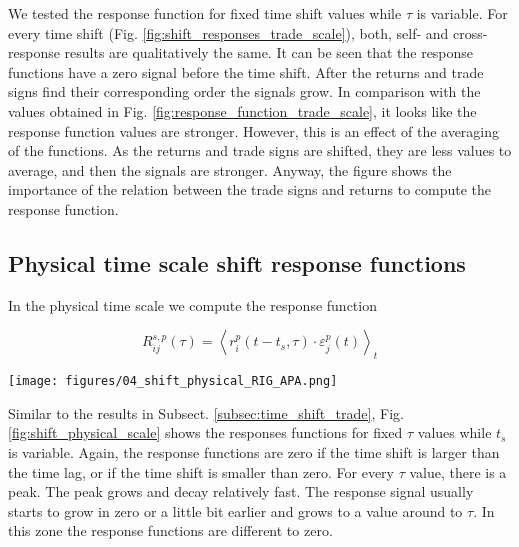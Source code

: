 We tested the response function for fixed time shift values while $\tau$ is
variable. For every time shift (Fig. \ref{fig:shift_responses_trade_scale}),
both, self- and cross-response results are qualitatively the same. It can be
seen that the response functions have a zero signal before the time shift.
After the returns and trade signs find their corresponding order the signals
grow. In comparison with the values obtained in Fig.
\ref{fig:response_function_trade_scale}, it looks like the response function
values are stronger. However, this is an effect of the averaging of the
functions. As the returns and trade signs are shifted, they are less values to
average, and then the signals are stronger. Anyway, the figure shows the
importance of the relation between the trade signs and returns to compute the
response function.

\subsection{Physical time scale shift response functions}
\label{subsec:time_shift_physical}

In the physical time scale we compute the response function

\begin{equation}\label{eq:time_shift_physical}
    R_{ij}^{s, p}\left(\tau\right)=\left\langle r^{p}_{i}
    \left(t-t_{s},\tau\right) \cdot\varepsilon^{p}_{j}
    \left(t\right)\right\rangle _{t}
\end{equation}

\begin{figure*}[htbp]
    \centering
    \texttt{[image: figures/04\_shift\_physical\_RIG\_APA.png]}
    \caption{Self-response functions $R_{ii}^{p}\left(\tau\right)$ excluding
             $\varepsilon^{p}_{i}\left(t\right) = 0$ in 2008 versus shift for
             the Transocean Ltd. stock (top) and cross-response functions
             $R_{ij}^{p}\left(\tau\right)$ excluding
             $\varepsilon^{p}_{j}\left(t\right) = 0$ in 2008 versus shift for
             the Transocean Ltd.-Apache Corp. stocks (bottom) in physical time
             scale.}
    \label{fig:shift_physical_scale}
\end{figure*}

Similar to the results in Subsect. \ref{subsec:time_shift_trade}, Fig.
\ref{fig:shift_physical_scale} shows the responses functions for fixed $\tau$
values while $t_{s}$ is variable. Again, the response functions are zero if the
time shift is larger than the time lag, or if the time shift is smaller than
zero. For every $\tau$ value, there is a peak. The peak grows and decay
relatively fast. The response signal usually starts to grow in zero or a little
bit earlier and grows to a value around to $\tau$. In this zone the response
functions are different to zero.

